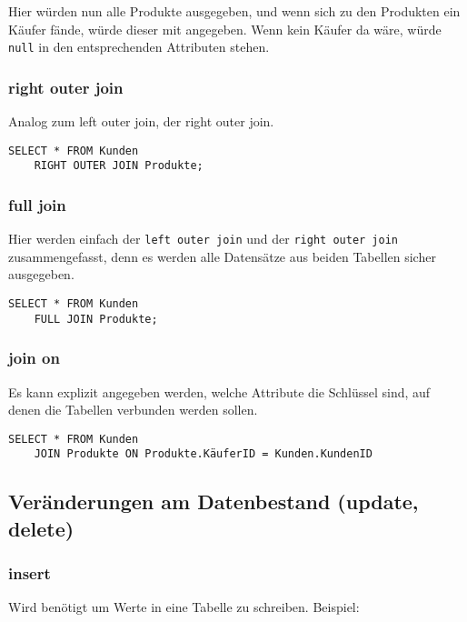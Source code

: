 Hier würden nun alle Produkte ausgegeben, und wenn sich zu den Produkten ein Käufer fände, würde dieser mit angegeben. Wenn kein Käufer da wäre, würde \texttt{null} in den entsprechenden Attributen stehen.


\subsubsection{right outer join}
Analog zum left outer join, der right outer join.

\begin{lstlisting}[caption={Right Join SQL}]
    SELECT * FROM Kunden
    RIGHT OUTER JOIN Produkte;
\end{lstlisting}


\subsubsection{full join}
Hier werden einfach der \texttt{left outer join} und der \texttt{right outer join} zusammengefasst, denn es werden alle Datensätze aus beiden Tabellen sicher ausgegeben.

\begin{lstlisting}[caption={Full Join SQL}]
    SELECT * FROM Kunden
    FULL JOIN Produkte;
\end{lstlisting}

\subsubsection{join on}
Es kann explizit angegeben werden, welche Attribute die Schlüssel sind, auf denen die Tabellen verbunden werden sollen.

\begin{lstlisting}[caption={JOIN ON Beispiel}]
    SELECT * FROM Kunden
    JOIN Produkte ON Produkte.KäuferID = Kunden.KundenID
\end{lstlisting}


\subsection{Veränderungen am Datenbestand (update, delete)}

\subsubsection{insert}
Wird benötigt um Werte in eine Tabelle zu schreiben. Beispiel:

